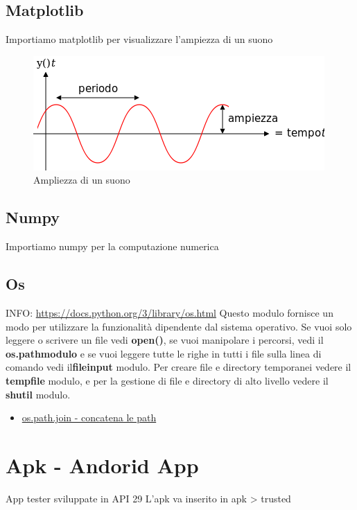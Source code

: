 \documentclass{article}
\begin{document}
\subsection{Matplotlib}
Importiamo matplotlib per visualizzare l'ampiezza di un suono
\begin{figure}[h!]
        \centering
        \includegraphics[scale= 0.2]{image/420px-Oscillazione_periodica.svg.png}
        \caption{Ampliezza di un suono}
        \label{fig:my_label}
    \end{figure}

\subsection{Numpy}
Importiamo numpy per la computazione numerica 
\subsection{Os}
INFO: \url{https://docs.python.org/3/library/os.html}
Questo modulo fornisce un modo per utilizzare la funzionalità dipendente dal sistema operativo. Se vuoi solo leggere o scrivere un file vedi \textbf{open()}, se vuoi manipolare i percorsi, vedi il \textbf{os.pathmodulo} e se vuoi leggere tutte le righe in tutti i file sulla linea di comando vedi il\textbf{fileinput} modulo. Per creare file e directory temporanei vedere il \textbf{tempfile} modulo, e per la gestione di file e directory di alto livello vedere il \textbf{shutil} modulo.
\begin{itemize}
    \item \href{ https://www.geeksforgeeks.org/python-os-path-join-method/}{os.path.join - concatena le path}
\end{itemize}
\section{Apk - Andorid App}
App tester sviluppate in API 29
L'apk va inserito in apk > trusted 
\end{document}
